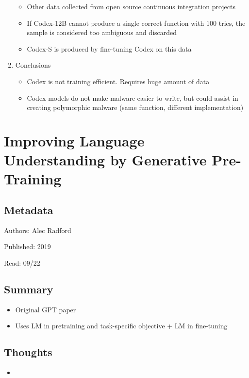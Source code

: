 \documentclass{article}
\begin{document}
\begin{enumerate}
\begin{itemize}
		\item Other data collected from open source continuous integration projects
		\item If Codex-12B cannot produce a single correct function with 100 tries, the sample is considered too ambiguous and discarded
		\item Codex-S is produced by fine-tuning Codex on this data
	\end{itemize}
	\item Conclusions
	\begin{itemize}
		\item Codex is not training efficient. Requires huge amount of data
		\item Codex models do not make malware easier to write, but could assist in creating polymorphic malware (same function, different implementation)
	\end{itemize}
\end{enumerate}

\pagebreak


\section*{Improving Language Understanding by Generative Pre-Training}

\subsection*{Metadata}

\noindent Authors: Alec Radford

\noindent Published: 2019

\noindent Read: 09/22

\subsection*{Summary}
\begin{itemize}
	\item Original GPT paper
	\item Uses LM in pretraining and task-specific objective + LM in fine-tuning
\end{itemize}

\subsection*{Thoughts}
\begin{itemize}
	\item
\end{itemize}
\end{document}
